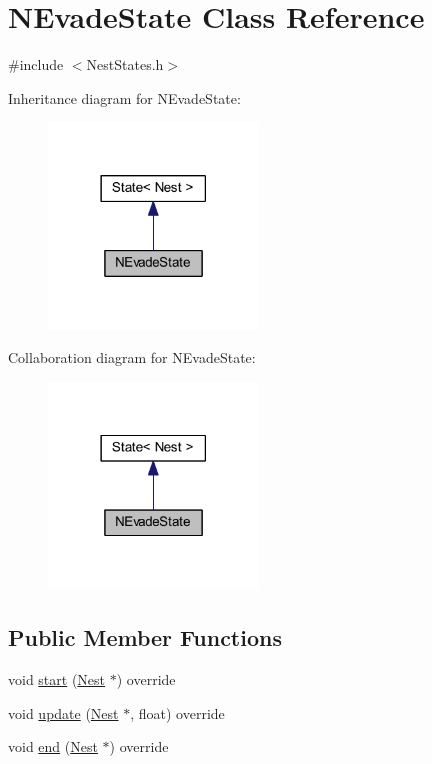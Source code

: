 \hypertarget{class_n_evade_state}{}\section{N\+Evade\+State Class Reference}
\label{class_n_evade_state}


{\ttfamily \#include $<$Nest\+States.\+h$>$}



Inheritance diagram for N\+Evade\+State\+:\nopagebreak
\begin{figure}[H]
\begin{center}
\leavevmode
\includegraphics[width=158pt]{class_n_evade_state__inherit__graph}
\end{center}
\end{figure}


Collaboration diagram for N\+Evade\+State\+:\nopagebreak
\begin{figure}[H]
\begin{center}
\leavevmode
\includegraphics[width=158pt]{class_n_evade_state__coll__graph}
\end{center}
\end{figure}
\subsection*{Public Member Functions}
\begin{DoxyCompactItemize}
\item 
void \hyperlink{class_n_evade_state_a4df3fb4c1325d9546ff1f659086d4f38}{start} (\hyperlink{class_nest}{Nest} $\ast$) override
\item 
void \hyperlink{class_n_evade_state_a9f4c58b444e53f79c9be0ebd85bf63a2}{update} (\hyperlink{class_nest}{Nest} $\ast$, float) override
\item 
void \hyperlink{class_n_evade_state_a2bdb23a457b6ef01dee943c0c26da079}{end} (\hyperlink{class_nest}{Nest} $\ast$) override
\end{DoxyCompactItemize}
